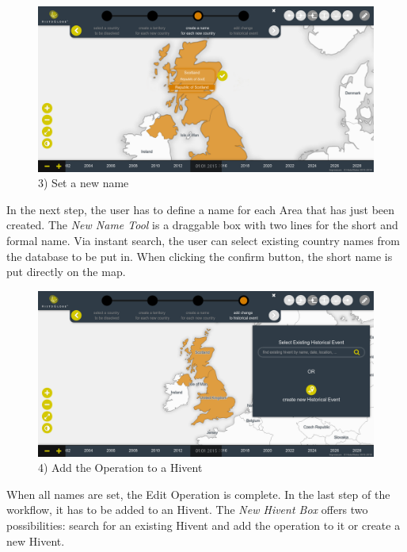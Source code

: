 \vspace{1em}
\begin{minipage}[t]{0.47\textwidth}

  \begin{figure}[H]
    \centering
    \includegraphics[width=1.0\textwidth]{graphics/development/final_interface/5_set_new_name.png}
    \caption{3) Set a new name}
    \label{fig:final_5_set_new_name}
  \end{figure}

  In the next step, the user has to define a name for each Area that has just been created. The \emph{New Name Tool} is a draggable box with two lines for the short and formal name. Via instant search, the user can select existing country names from the database to be put in. When clicking the confirm button, the short name is put directly on the map.

\end{minipage}    %
\hspace{1.5em}    %
\begin{minipage}[t]{0.47\textwidth}

  \begin{figure}[H]
    \centering
    \includegraphics[width=1.0\textwidth]{graphics/development/final_interface/6_add_change_to_hivent_1.png}
    \caption{4) Add the Operation to a Hivent}
    \label{fig:final_6_add_change_to_hivent_1}
  \end{figure}

  When all names are set, the Edit Operation is complete. In the last step of the workflow, it has to be added to an Hivent. The \emph{New Hivent Box} offers two possibilities: search for an existing Hivent and add the operation to it or create a new Hivent.

\end{minipage}

